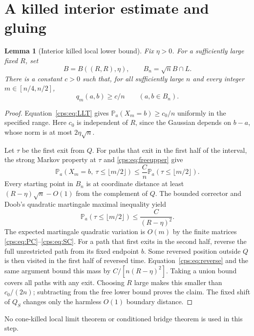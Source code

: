 \documentclass[11pt,letterpaper]{article}
\numberwithin{equation}{section}
\newtheorem{lemma}[theorem]{Lemma}
\theoremstyle{remark}\newtheorem{remark}[theorem]{Remark}
\newcommand{\PP}{\mathbb P}
\begin{document}
\section{A killed interior estimate and gluing}\label{cps:sec:gluing}
\begin{lemma}[Interior killed local lower bound]\label{cps:lem:killed}
Fix $\eta>0$. For a sufficiently large fixed $R$, set
\begin{equation}
 B=B((R,R),\eta),\qquad B_n=\sqrt nB\cap L.
\end{equation}
There is a constant $c>0$ such that, for all sufficiently large $n$ and every integer $m\in[n/4,n/2]$,
\begin{equation}\label{cps:eq:killedlocal}
 q_m(a,b)\ge c/n\qquad(a,b\in B_n).
\end{equation}
\end{lemma}
\begin{proof}
Equation~\eqref{cps:eq:LLT} gives $\PP_a(X_m=b)\ge c_0/n$ uniformly in the specified range. Here $c_0$ is independent of $R$, since the Gaussian depends on $b-a$, whose norm is at most $2\eta\sqrt n$.

Let $\tau$ be the first exit from $Q$. For paths that exit in the first half of the interval, the strong Markov property at $\tau$ and \eqref{cps:eq:freeupper} give
\begin{equation}
 \PP_a(X_m=b,\ \tau\le\lfloor m/2\rfloor)
 \le\frac Cn\PP_a(\tau\le\lfloor m/2\rfloor).
\end{equation}
Every starting point in $B_n$ is at coordinate distance at least $(R-\eta)\sqrt n-O(1)$ from the complement of $Q$. The bounded corrector and Doob's quadratic martingale maximal inequality yield
\begin{equation}
 \PP_a(\tau\le\lfloor m/2\rfloor)\le\frac C{(R-\eta)^2}.
\end{equation}
The expected martingale quadratic variation is $O(m)$ by the finite matrices \eqref{cps:eq:PC}--\eqref{cps:eq:SC}. For a path that first exits in the second half, reverse the full unrestricted path from its fixed endpoint $b$. Some reversed position outside $Q$ is then visited in the first half of reversed time. Equation~\eqref{cps:eq:reverse} and the same argument bound this mass by $C/[n(R-\eta)^2]$. Taking a union bound covers all paths with any exit. Choosing $R$ large makes this smaller than $c_0/(2n)$; subtracting from the free lower bound proves the claim. The fixed shift of $Q_S$ changes only the harmless $O(1)$ boundary distance.
\end{proof}
No cone-killed local limit theorem or conditioned bridge theorem is used in this step.
\end{document}
